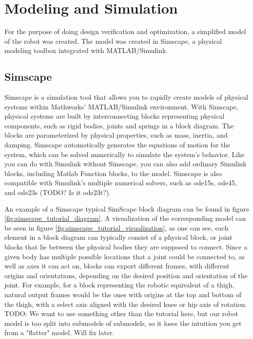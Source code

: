 \section{Modeling and Simulation}
\label{sec:modeling}
For the purpose of doing design verification and optimization, a simplified model of the robot was created. The model was created in Simscape, a physical modeling toolbox integrated with MATLAB/Simulink. 
\subsection{Simscape}

Simscape is a simulation tool that allows you to rapidly create models of physical systems within Mathworks' MATLAB/Simulink environment. With Simscape, physical systems are built by interconnecting blocks representing physical components, such as rigid bodies, joints and springs in a block diagram. The blocks are parameterized by physical properties, such as mass, inertia, and damping. Simscape automatically generates the equations of motion for the system, which can be solved numerically to simulate the system's behavior. Like you can do with Simulink without Simscape, you can also add ordinary Simulink blocks, including Matlab Function blocks, to the model. Simscape is also compatible with Simulink's multiple numerical solvers, such as ode15s, ode45, and ode23s (TODO? Is it ode23t?). 

An example of a Simscape typical SimScape block diagram can be found in figure \ref{fig:simscape_tutorial_diagram}. A visualization of the corresponding model can be seen in figure \ref{fig:simscape_tutorial_visualization}, as one can see, each element in a block diagram can typically consist of a physical block, or joint blocks that lie between the physical bodies they are supposed to connect. Since a given body has multiple possible locations that a joint could be connected to, as well as axes it can act on, blocks can export different frames, with different origins and orientations, depending on the desired position and orientation of the joint. For example, for a block representing the robotic equivalent of a thigh, natural output frames would be the ones with origins at the top and bottom of the thigh, with a select axis aligned with the desired knee or hip axis of rotation. TODO: We want to use something other than the tutorial here, but our robot model is too split into submodels of submodels, so it loses the intuition you get from a "flatter" model. Will fix later. 


